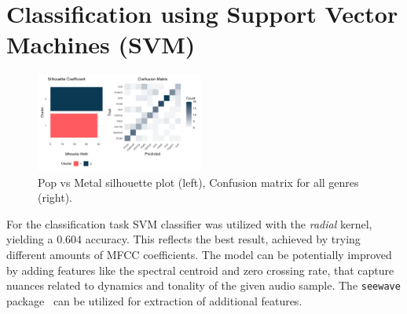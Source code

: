 \documentclass[twocolumn]{article}
\begin{document}
\section{Classification using Support Vector Machines (SVM)}
\begin{figure}[hht]
	\centering
	\includegraphics[width=0.49\textwidth]{images/clust_class.pdf}
  \caption{Pop vs Metal silhouette plot (left), Confusion matrix for all genres (right).}
	\label{fig:corr}
\end{figure}
For the classification task SVM classifier was utilized with the \textit{radial} kernel, yielding a $0.604$ accuracy. This reflects the best result, achieved by trying different amounts of MFCC coefficients. The model can be potentially improved by adding features like the spectral centroid and zero crossing rate, that capture nuances related to dynamics and tonality of the given audio sample. The \texttt{seewave} package~\cite{seewave} can be utilized for extraction of additional features.

\end{document}
